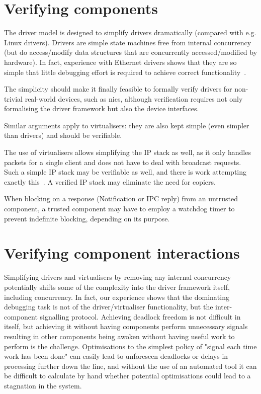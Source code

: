 \documentclass[a4paper,12pt]{report}
\begin{document}
\section{Verifying components}

The driver model is designed to simplify drivers dramatically
(compared with e.g. Linux drivers).  Drivers are simple state machines
free from internal concurrency (but do access/modify data structures
that are concurrently accessed/modified by hardware). In fact,
experience with Ethernet drivers shows that they are so simple that
little debugging effort is required to achieve correct
functionality~\citep{Parker:bsc}.

The simplicity should make it finally feasible to formally verify
drivers for non-trivial real-world devices, such as \glspl{nic},
although verification requires not only formalising the driver framework
but also the device interfaces.

Similar arguments apply to virtualisers: they are also kept
simple (even simpler than drivers)  and
should be verifiable.

The use of virtualisers allows simplifying the IP stack as well, as it
only handles packets for a single client and does not have to deal
with broadcast requests. Such a simple IP stack may be verifiable as
well, and there is work attempting exactly this~\citep{Rollins_23}. A
verified IP stack may eliminate the need for copiers.

When blocking on a response (Notification or IPC reply) from an
untrusted component, a trusted component may have to employ a watchdog timer
to prevent indefinite blocking, depending on its purpose.

\section{Verifying component interactions}

Simplifying drivers and virtualisers by removing any internal
concurrency potentially shifts some of the complexity into the driver
framework itself, including concurrency. In fact, our experience shows
that the dominating debugging task is not of the driver/virtualiser
functionality, but the inter-component signalling protocol. Achieving
deadlock freedom is not difficult in itself, but achieving it without having
components perform unnecessary signals resulting in other components
being awoken without having useful work to perform is the challenge.
Optimisations to the simplest policy of "signal each time work has been
done" can easily lead to unforeseen deadlocks or delays in processing
further down the line, and without the use of an automated tool it can
be difficult to calculate by hand whether potential optimisations could
lead to a stagnation in the system.
\end{document}
